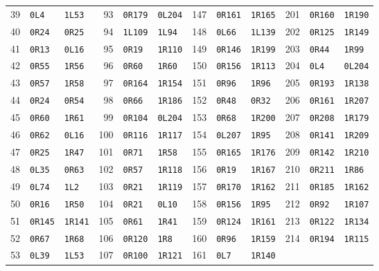 \begin{longtable}{@{}rll@{\qquad}rll@{\qquad}rll@{\qquad}rll@{}}
39 & \texttt{0L4} & \texttt{1L53} & 93 & \texttt{0R179} & \texttt{0L204} & 147 & \texttt{0R161} & \texttt{1R165} & 201 & \texttt{0R160} & \texttt{1R190}\\
40 & \texttt{0R24} & \texttt{0R25} & 94 & \texttt{1L109} & \texttt{1L94} & 148 & \texttt{0L66} & \texttt{1L139} & 202 & \texttt{0R125} & \texttt{1R149}\\
41 & \texttt{0R13} & \texttt{0L16} & 95 & \texttt{0R19} & \texttt{1R110} & 149 & \texttt{0R146} & \texttt{1R199} & 203 & \texttt{0R44} & \texttt{1R99}\\
42 & \texttt{0R55} & \texttt{1R56} & 96 & \texttt{0R60} & \texttt{1R60} & 150 & \texttt{0R156} & \texttt{1R113} & 204 & \texttt{0L4} & \texttt{0L204}\\
43 & \texttt{0R57} & \texttt{1R58} & 97 & \texttt{0R164} & \texttt{1R154} & 151 & \texttt{0R96} & \texttt{1R96} & 205 & \texttt{0R193} & \texttt{1R138}\\
44 & \texttt{0R24} & \texttt{0R54} & 98 & \texttt{0R66} & \texttt{1R186} & 152 & \texttt{0R48} & \texttt{0R32} & 206 & \texttt{0R161} & \texttt{1R207}\\
45 & \texttt{0R60} & \texttt{1R61} & 99 & \texttt{0R104} & \texttt{0L204} & 153 & \texttt{0R68} & \texttt{1R200} & 207 & \texttt{0R208} & \texttt{1R179}\\
46 & \texttt{0R62} & \texttt{0L16} & 100 & \texttt{0R116} & \texttt{1R117} & 154 & \texttt{0L207} & \texttt{1R95} & 208 & \texttt{0R141} & \texttt{1R209}\\
47 & \texttt{0R25} & \texttt{1R47} & 101 & \texttt{0R71} & \texttt{1R58} & 155 & \texttt{0R165} & \texttt{1R176} & 209 & \texttt{0R142} & \texttt{1R210}\\
48 & \texttt{0L35} & \texttt{0R63} & 102 & \texttt{0R57} & \texttt{1R118} & 156 & \texttt{0R19} & \texttt{1R167} & 210 & \texttt{0R211} & \texttt{1R86}\\
49 & \texttt{0L74} & \texttt{1L2} & 103 & \texttt{0R21} & \texttt{1R119} & 157 & \texttt{0R170} & \texttt{1R162} & 211 & \texttt{0R185} & \texttt{1R162}\\
50 & \texttt{0R16} & \texttt{1R50} & 104 & \texttt{0R21} & \texttt{0L10} & 158 & \texttt{0R156} & \texttt{1R95} & 212 & \texttt{0R92} & \texttt{1R107}\\
51 & \texttt{0R145} & \texttt{1R141} & 105 & \texttt{0R61} & \texttt{1R41} & 159 & \texttt{0R124} & \texttt{1R161} & 213 & \texttt{0R122} & \texttt{1R134}\\
52 & \texttt{0R67} & \texttt{1R68} & 106 & \texttt{0R120} & \texttt{1R8} & 160 & \texttt{0R96} & \texttt{1R159} & 214 & \texttt{0R194} & \texttt{1R115}\\
53 & \texttt{0L39} & \texttt{1L53} & 107 & \texttt{0R100} & \texttt{1R121} & 161 & \texttt{0L7} & \texttt{1R140} &  &  & \\
\end{longtable}
\endgroup
